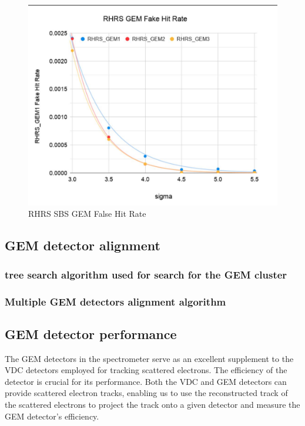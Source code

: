 \begin{figure}[!htbp]
    \centering
    \includegraphics[width=\textwidth]{images/chap5/rhrs_fake_hit_rate.png}
    \caption{RHRS SBS GEM False Hit Rate}
    \label{fig:rhrs_fake_hit_rate}
\end{figure}

\subsection{GEM detector alignment}

\subsubsection{tree search algorithm used for search for the GEM cluster}
\subsubsection{Multiple GEM detectors alignment algorithm }
\subsection{GEM detector performance}

The GEM detectors in the spectrometer serve as an excellent supplement to the VDC detectors employed for tracking scattered electrons. The efficiency of the detector is crucial for its performance. Both the VDC and GEM detectors can provide scattered electron tracks, enabling us to use the reconstructed track of the scattered electrons to project the track onto a given detector and measure the GEM detector's efficiency.

